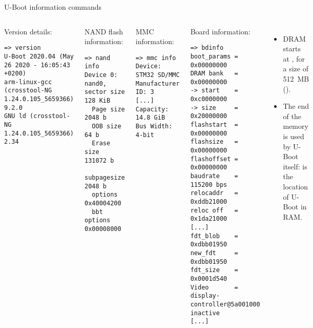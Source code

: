 \begin{frame}[fragile]{U-Boot information commands}

  \begin{columns}[T]
    \begin{block}{Version details: }
      {\tiny
\begin{verbatim}
=> version
U-Boot 2020.04 (May 26 2020 - 16:05:43 +0200)
arm-linux-gcc (crosstool-NG 1.24.0.105_5659366) 9.2.0
GNU ld (crosstool-NG 1.24.0.105_5659366) 2.34
\end{verbatim}
      }
    \end{block}

    \begin{block}{NAND flash information: }
      {\tiny
\begin{verbatim}
=> nand info
Device 0: nand0, sector size 128 KiB
  Page size       2048 b
  OOB size          64 b
  Erase size    131072 b
  subpagesize     2048 b
  options     0x40004200
  bbt options 0x00008000
\end{verbatim}
      }
    \end{block}

    \begin{block}{MMC information: }
      {\tiny
\begin{verbatim}
=> mmc info
Device: STM32 SD/MMC
Manufacturer ID: 3
[...]
Capacity: 14.8 GiB
Bus Width: 4-bit
\end{verbatim}
      }
    \end{block}


    \begin{block}{Board information: }
      {\tiny
\begin{verbatim}
=> bdinfo
boot_params = 0x00000000
DRAM bank   = 0x00000000
-> start    = 0xc0000000
-> size     = 0x20000000
flashstart  = 0x00000000
flashsize   = 0x00000000
flashoffset = 0x00000000
baudrate    = 115200 bps
relocaddr   = 0xddb21000
reloc off   = 0x1da21000
[...]
fdt_blob    = 0xdbb01950
new_fdt     = 0xdbb01950
fdt_size    = 0x0001d540
Video       = display-controller@5a001000 inactive
[...]
\end{verbatim}
      }
    \end{block}

    {\scriptsize
      \begin{itemize}
      \item DRAM starts at , for a size of 512~MB
        ().
      \item The end of the memory is used by U-Boot itself:
         is the location of U-Boot in RAM.
      \end{itemize}
    }
  \end{columns}
\end{frame}


